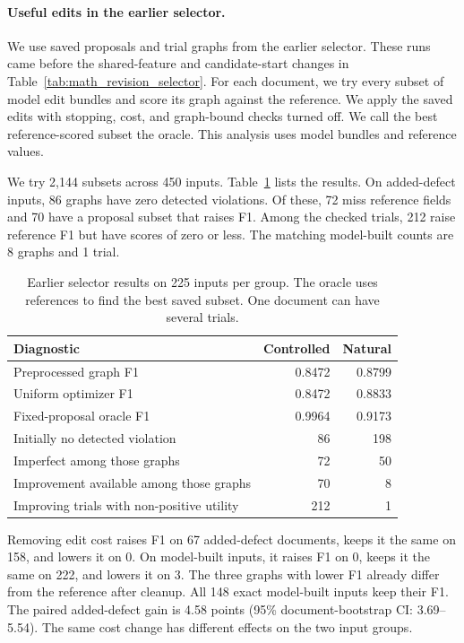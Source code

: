 \paragraph{Useful edits in the earlier selector.}

We use saved proposals and trial graphs from the earlier selector.
These runs came before the shared-feature and candidate-start changes in
Table~\ref{tab:math_revision_selector}. For each document, we try every
subset of model edit bundles and score its graph against the reference.
We apply the saved edits with stopping, cost, and graph-bound checks turned
off. We call the best reference-scored subset the oracle.
This analysis uses model bundles and reference values.

We try 2,144 subsets across 450 inputs.
Table~\ref{tab:selection_bottlenecks} lists the results.
On added-defect inputs, 86 graphs have zero detected violations.
Of these, 72 miss reference fields and 70 have a proposal subset that raises
F1. Among the checked trials, 212 raise reference F1 but have scores of zero
or less. The matching model-built counts are 8 graphs and 1 trial.

\begin{table}[t]
\centering
\caption{Earlier selector results on 225 inputs per group. The oracle uses references to find the best saved subset. One document can have several trials.}
\label{tab:selection_bottlenecks}
\small
\begin{tabular}{lrr}
\toprule
Diagnostic & Controlled & Natural \\
\midrule
Preprocessed graph F1 & 0.8472 & 0.8799 \\
Uniform optimizer F1 & 0.8472 & 0.8833 \\
Fixed-proposal oracle F1 & 0.9964 & 0.9173 \\
Initially no detected violation & 86 & 198 \\
Imperfect among those graphs & 72 & 50 \\
Improvement available among those graphs & 70 & 8 \\
Improving trials with non-positive utility & 212 & 1 \\
\bottomrule
\end{tabular}
\end{table}

Removing edit cost raises F1 on 67 added-defect documents, keeps it the same
on 158, and lowers it on 0. On model-built inputs, it raises F1 on 0,
keeps it the same on 222, and lowers it on 3.
The three graphs with lower F1 already differ from the reference after
cleanup. All 148 exact model-built inputs keep their F1.
The paired added-defect gain is 4.58 points
(95\% document-bootstrap CI: 3.69--5.54).
The same cost change has different effects on the two input groups.
